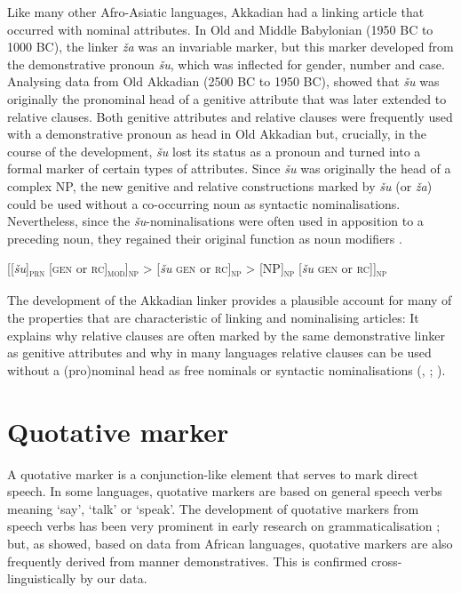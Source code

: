 \documentclass[output=paper,colorlinks,citecolor=brown]{langscibook}
\begin{document}
Like many other Afro-Asiatic languages, Akkadian had a linking article that occurred with nominal attributes. In Old and Middle Babylonian (1950 BC to 1000 BC), the linker \textit{ža} was an invariable marker, but this marker developed from the demonstrative pronoun \textit{šu}, which was inflected for gender, number and case. Analysing data from Old Akkadian (2500 BC to 1950 BC), \citet{Deutscher2001,Deutscher2009} showed that \textit{šu} was originally the pronominal head of a genitive attribute that was later extended to relative clauses. Both genitive attributes and relative clauses were frequently used with a demonstrative pronoun as head in Old Akkadian but, crucially, in the course of the development, \textit{šu} lost its status as a pronoun and turned into a formal marker of certain types of attributes. Since \textit{šu} was originally the head of a complex NP, the new genitive and relative constructions marked by \textit{šu} (or \textit{ža}) could be used without a co-occurring noun as syntactic nominalisations. Nevertheless, since the \textit{šu}-nominalisations were often used in apposition to a preceding noun, they regained their original function as noun modifiers .

\ea\label{ex:diessel:10}
{[[\textit{šu}]\textsc{\textsubscript{prn}} [\textsc{gen} or \textsc{rc]}\textsc{\textsubscript{mod}}]\textsc{\textsubscript{np}} > [\textit{šu} \textsc{gen} or \textsc{rc}]\textsc{\textsubscript{np}} > [NP]\textsc{\textsubscript{np}} [\textit{šu} \textsc{gen} or \textsc{rc}]]\textsc{\textsubscript{np}}}\\
\z

The development of the Akkadian linker provides a plausible account for many of the properties that are characteristic of linking and nominalising articles: It explains why relative clauses are often marked by the same demonstrative linker as genitive attributes and why in many languages relative clauses can be used without a (pro)nominal head as free nominals or syntactic nominalisations (\citealt{Schuh1983}, \citeyear{Schuh1990}; \citealt{Aristar1991}).

\section{Quotative marker}\label{sec:diessel:4}

A quotative marker is a conjunction-like element that serves to mark direct speech. In some languages, quotative markers are based on general speech verbs meaning ‘say’, ‘talk’ or ‘speak’. The development of quotative markers from speech verbs has been very prominent in early research on grammaticalisation \citep{Lord1993,Klamer2000}; but, as \citet{Güldemann2008} showed, based on data from African languages, quotative markers are also frequently derived from manner demonstratives. This is confirmed cross-linguistically by our data.
\end{document}

